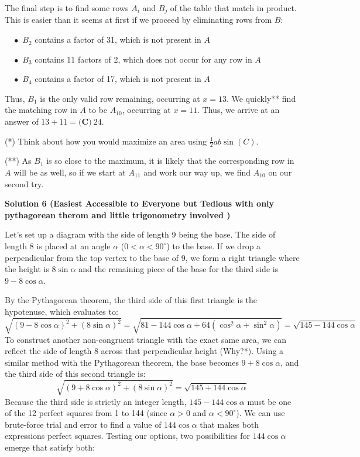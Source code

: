 \begin{enumerate}
 The final step is to find some rows \(A_i\) and \(B_j\) of the table that match in product. This is easier than it seems at first if we proceed by eliminating rows from \(B\):

 $\quad\bullet$ \(B_2\) contains a factor of 31, which is not present in \(A\)

 $\quad\bullet$ \(B_3\) contains 11 factors of 2, which does not occur for any row in \(A\)

 $\quad\bullet$ \(B_4\) contains a factor of 17, which is not present in \(A\)

 Thus, \(B_1\) is the only valid row remaining, occurring at \(x=13\). We quickly** find the matching row in \(A\) to be \(A_{10}\), occurring at \(x=11\). Thus, we arrive at an answer of \(13+11=\boxed{\textbf{(C)}\ 24}\).

 (*) Think about how you would maximize an area using \(\frac 12 ab\sin(C)\).

 (**) As \(B_1\) is so close to the maximum, it is likely that the corresponding row in \(A\) will be as well, so if we start at \(A_{11}\) and work our way up, we find \(A_{10}\) on our second try.

 



\textbf{Solution 6 (Easiest Accessible to Everyone but Tedious with only pythagorean therom and little trigonometry involved )}

Let's set up a diagram with the side of length 9 being the base. The side of length 8 is placed at an angle \(\alpha\) (\(0 < \alpha < 90^\circ\)) to the base. If we drop a perpendicular from the top vertex to the base of 9, we form a right triangle where the height is \(8\sin\alpha\) and the remaining piece of the base for the third side is \(9 - 8\cos\alpha\). 

 By the Pythagorean theorem, the third side of this first triangle is the hypotenuse, which evaluates to:
 \[\sqrt{(9-8\cos\alpha)^2 + (8\sin\alpha)^2} = \sqrt{81 - 144\cos\alpha + 64(\cos^2\alpha + \sin^2\alpha)} = \sqrt{145-144\cos\alpha}\]To construct another non-congruent triangle with the exact same area, we can reflect the side of length 8 across that perpendicular height (Why?*). Using a similar method with the Pythagorean theorem, the base becomes \(9+8\cos\alpha\), and the third side of this second triangle is:
 \[\sqrt{(9+8\cos\alpha)^2 + (8\sin\alpha)^2} = \sqrt{145+144\cos\alpha}\]Because the third side is strictly an integer length, \(145-144\cos\alpha\) must be one of the 12 perfect squares from 1 to 144 (since \(\alpha > 0\) and \(\alpha < 90^\circ\)). We can use brute-force trial and error to find a value of \(144\cos\alpha\) that makes both expressions perfect squares. Testing our options, two possibilities for \(144\cos\alpha\) emerge that satisfy both:


\end{enumerate}

